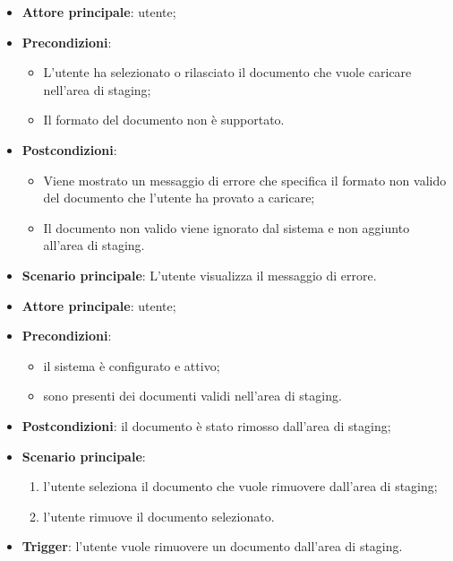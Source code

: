 \documentclass[10pt, a4paper]{article}
\begin{document}
    \begin{itemize}
        \item \textbf{Attore principale}: utente;
        \item \textbf{Precondizioni}:
            \begin{itemize}
                \item L’utente ha selezionato o rilasciato il documento che vuole caricare nell’area di staging;
                \item Il formato del documento non è supportato.
            \end{itemize}
        \item \textbf{Postcondizioni}:
            \begin{itemize}
                \item Viene mostrato un messaggio di errore che specifica il formato non valido del documento che l'utente ha provato a caricare;
                \item Il documento non valido viene ignorato dal sistema e non aggiunto all’area di staging.
            \end{itemize}
        \item \textbf{Scenario principale}: L’utente visualizza il messaggio di errore.
    \end{itemize}

    \begin{itemize}
        \item \textbf{Attore principale}: utente;
        \item \textbf{Precondizioni}:
            \begin{itemize}
                \item il sistema è configurato e attivo;
                \item sono presenti dei documenti validi nell’area di staging.
            \end{itemize}
        \item \textbf{Postcondizioni}: il documento è stato rimosso dall’area di staging;
        \item \textbf{Scenario principale}: 
            \begin{enumerate}
                \item l’utente seleziona il documento che vuole rimuovere dall’area di staging;
                \item l’utente rimuove il documento selezionato.
            \end{enumerate}
        \item \textbf{Trigger}: l’utente vuole rimuovere un documento dall’area di staging.
    \end{itemize}
\end{document}
